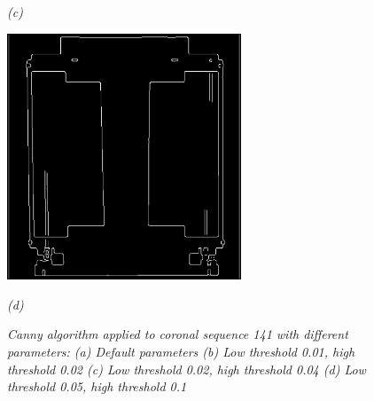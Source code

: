 \begin{figure}[htb]
\begin{minipage}[b]{2.75in}
    \centerline{\emph{(c)}}
  \end{minipage}\medskip
  \begin{minipage}[b]{2.75in}
    \centering
    \centerline{\mbox{\includegraphics[width=2.75in]{data_extraction/images/canny/0.05_0.1/20121017_141.eps}}}
    \centerline{\emph{(d)}}
  \end{minipage}
  \caption{\emph{Canny algorithm applied to coronal sequence 141 with different parameters: (a) Default parameters (b) Low threshold 0.01, high threshold 0.02 (c) Low threshold 0.02, high threshold 0.04 (d) Low threshold 0.05, high threshold  0.1}} \label{fig:canny_ct_141}
\end{figure}

